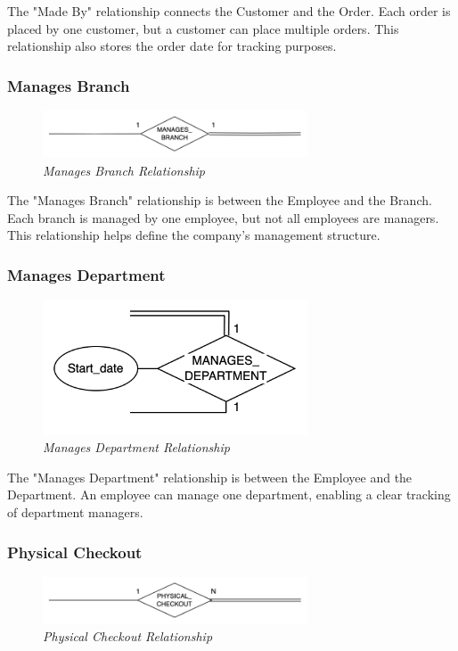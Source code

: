 \documentclass[11pt]{article}
\begin{document}
The "Made By" relationship connects the Customer and the Order. Each order is placed by one customer, but a customer can place multiple orders. This relationship also stores the order date for tracking purposes.

\subsubsection{Manages Branch}
\begin{figure}[H]
  \centering
  \includegraphics[width=0.7\textwidth]{images/relationships/manages_branch.png}
  \caption{\textit{Manages Branch Relationship}}
\end{figure}

The "Manages Branch" relationship is between the Employee and the Branch. Each branch is managed by one employee, but not all employees are managers. This relationship helps define the company's management structure.

\subsubsection{Manages Department}
\begin{figure}[H]
  \centering
  \includegraphics[width=0.7\textwidth]{images/relationships/manages_department.png}
  \caption{\textit{Manages Department Relationship}}
\end{figure}

The "Manages Department" relationship is between the Employee and the Department. An employee can manage one department, enabling a clear tracking of department managers.

\subsubsection{Physical Checkout}
\begin{figure}[H]
  \centering
  \includegraphics[width=0.7\textwidth]{images/relationships/physical_checkout.png}
  \caption{\textit{Physical Checkout Relationship}}
\end{figure}
\end{document}
